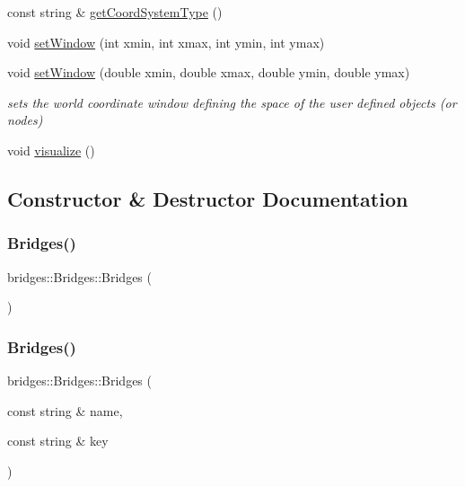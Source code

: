 \begin{DoxyCompactItemize}
const string \& \hyperlink{classbridges_1_1_bridges_aac3cdb607177ff537f5160c3790d814a}{get\+Coord\+System\+Type} ()
\item 
void \hyperlink{classbridges_1_1_bridges_a0465bca83056a72ba4db82b60e622163}{set\+Window} (int xmin, int xmax, int ymin, int ymax)
\item 
void \hyperlink{classbridges_1_1_bridges_aa0bfa955d36a85fa9ffa31a0bc6c19c4}{set\+Window} (double xmin, double xmax, double ymin, double ymax)
\begin{DoxyCompactList}\small\item\em sets the world coordinate window defining the space of the user defined objects (or nodes) \end{DoxyCompactList}\item 
void \hyperlink{classbridges_1_1_bridges_a2806e395134614cdd6327400b53d28ad}{visualize} ()
\end{DoxyCompactItemize}


\subsection{Constructor \& Destructor Documentation}
\mbox{\label{classbridges_1_1_bridges_aab8b250b2b5ba0034ceb2494fe5ea437}} 
\subsubsection{\texorpdfstring{Bridges()}{Bridges()}\hspace{0.1cm}{\footnotesize\ttfamily [1/3]}}
{\footnotesize\ttfamily bridges\+::\+Bridges\+::\+Bridges (\begin{DoxyParamCaption}{ }\end{DoxyParamCaption})\hspace{0.3cm}{\ttfamily [inline]}}

\mbox{\label{classbridges_1_1_bridges_a21d9e98cb1f3994300079b489f14e71e}} 
\subsubsection{\texorpdfstring{Bridges()}{Bridges()}\hspace{0.1cm}{\footnotesize\ttfamily [2/3]}}
{\footnotesize\ttfamily bridges\+::\+Bridges\+::\+Bridges (\begin{DoxyParamCaption}\item[{const string \&}]{name,  }\item[{const string \&}]{key }\end{DoxyParamCaption})\hspace{0.3cm}{\ttfamily [inline]}}



